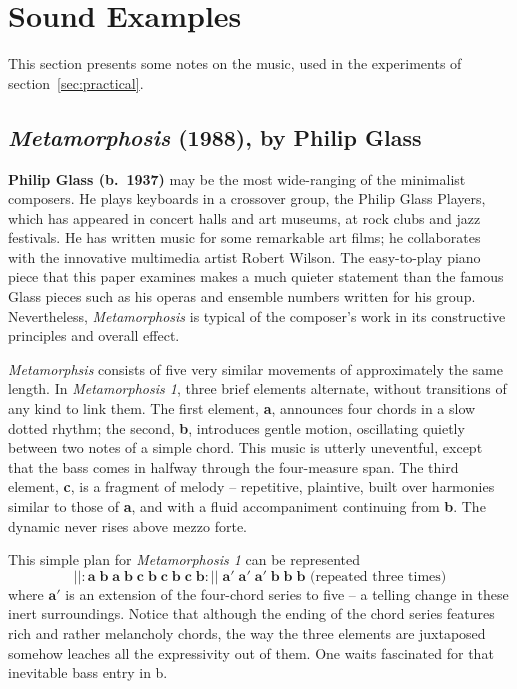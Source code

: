 \section{Sound Examples}
This section presents some notes on the music, used in the
experiments of section~\ref{sec:practical}.

\subsection{\emph{Metamorphosis} (1988), by Philip
Glass\protect\footnotemark} 
\begin{define}{\bf Philip Glass (b.~1937) }
may be the most wide-ranging of the minimalist composers.  He plays
keyboards in a crossover group, the Philip Glass Players, which has
appeared in concert halls and art museums, at rock clubs and jazz
festivals.  He has written music for some remarkable art films; he
collaborates with the innovative multimedia artist Robert Wilson.  The
easy-to-play piano piece that this paper examines makes a much quieter
statement than the famous Glass pieces such as his operas and ensemble
numbers written for his group.  Nevertheless, \emph{Metamorphosis} is
typical of the composer's work in its constructive principles and
overall effect.

\emph{Metamorphsis} consists of five very similar movements of
approximately the same length.  In \emph{Metamorphosis 1}, three brief
elements alternate, without transitions of any kind to link them.  The
first element, {\bf a}, announces four chords in a slow dotted rhythm;
the second, {\bf b}, introduces gentle motion, oscillating quietly
between two notes of a simple chord.  This music is utterly
uneventful, except that the bass comes in halfway through the
four-measure span.  The third element, {\bf c}, is a fragment of
melody -- repetitive, plaintive, built over harmonies similar to those
of {\bf a}, and with a fluid accompaniment continuing from {\bf b}.
The dynamic never rises above mezzo forte.  

This simple plan for \emph{Metamorphosis 1} can be represented
\newcommand{\Aa}{\mathbf{a}}
\newcommand{\Bb}{\mathbf{b}}
\newcommand{\Cc}{\mathbf{c}}
\[ ||: \Aa \; \Bb \; \Aa \; \Bb \; \Cc \; \Bb \; \Cc \; \Bb \; \Cc \; \Bb :|| \; \Aa' \; \Aa' \; \Aa' \; \Bb \; \Bb \; \Bb 
\mbox{ (repeated three times)}\]
where $\Aa'$ is an extension of the four-chord series to five -- a
telling change in these inert surroundings.  Notice that although the
ending of the chord series features rich and rather melancholy chords,
the way the three elements are juxtaposed somehow leaches all the
expressivity out of them.  One waits fascinated for that inevitable
bass entry in b.
\end{define}